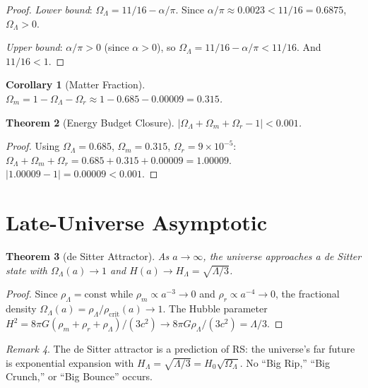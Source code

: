 \documentclass[12pt,a4paper]{article}
\newtheorem{theorem}{Theorem}[section]
\newtheorem{corollary}[theorem]{Corollary}
\theoremstyle{definition}
\theoremstyle{remark}
\newtheorem{remark}[theorem]{Remark}
\begin{document}
\begin{proof}
\textit{Lower bound}:
$\Omega_\Lambda = 11/16 - \alpha/\pi$.  Since
$\alpha/\pi \approx 0.0023 < 11/16 = 0.6875$,
$\Omega_\Lambda > 0$.

\textit{Upper bound}:
$\alpha/\pi > 0$ (since $\alpha > 0$), so
$\Omega_\Lambda = 11/16 - \alpha/\pi < 11/16$.
And $11/16 < 1$.
\end{proof}

\begin{corollary}[Matter Fraction]
$\Omega_m = 1 - \Omega_\Lambda - \Omega_r \approx 1 - 0.685 -
0.00009 = 0.315$.
\end{corollary}

\begin{theorem}[Energy Budget Closure]
\label{thm:closure}
$|\Omega_\Lambda + \Omega_m + \Omega_r - 1| < 0.001$.
\end{theorem}

\begin{proof}
Using $\Omega_\Lambda = 0.685$, $\Omega_m = 0.315$,
$\Omega_r = 9 \times 10^{-5}$:
$\Omega_\Lambda + \Omega_m + \Omega_r = 0.685 + 0.315 + 0.00009
= 1.00009$.  $|1.00009 - 1| = 0.00009 < 0.001$.
\end{proof}

\section{Late-Universe Asymptotic}
\label{sec:asymptotic}

\begin{theorem}[de Sitter Attractor]
As $a \to \infty$, the universe approaches a de Sitter state with
$\Omega_\Lambda(a) \to 1$ and $H(a) \to H_\Lambda = \sqrt{
\Lambda/3}$.
\end{theorem}

\begin{proof}
Since $\rho_\Lambda = \mathrm{const}$ while
$\rho_m \propto a^{-3} \to 0$ and $\rho_r \propto a^{-4} \to 0$,
the fractional density $\Omega_\Lambda(a) = \rho_\Lambda/
\rho_{\mathrm{crit}}(a) \to 1$.  The Hubble parameter
$H^2 = 8\pi G(\rho_m + \rho_r + \rho_\Lambda)/(3c^2) \to
8\pi G \rho_\Lambda/(3c^2) = \Lambda/3$.
\end{proof}

\begin{remark}
The de Sitter attractor is a prediction of RS: the universe's far
future is exponential expansion with $H_\Lambda = \sqrt{\Lambda/3}
= H_0\sqrt{\Omega_\Lambda}$.  No ``Big Rip,'' ``Big Crunch,'' or
``Big Bounce'' occurs.
\end{remark}
\end{document}
